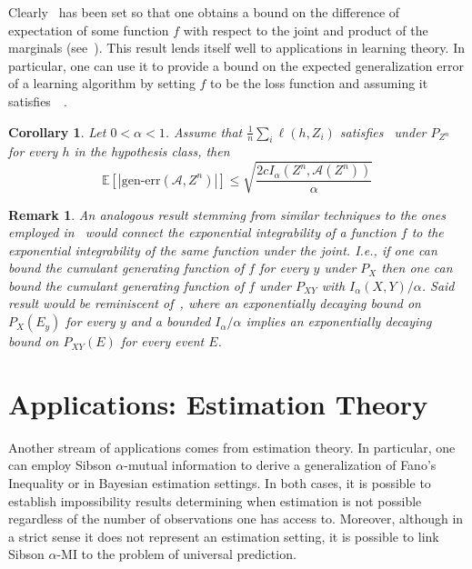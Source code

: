 \documentclass{article}
\numberwithin{theorem}{section}
\newtheorem{corollary}[theorem]{Corollary}
\numberwithin{example}{section}
\newtheorem{remark}{Remark}
\numberwithin{remark}{section}
\numberwithin{definition}{section}
\begin{document}
Clearly~ has been set so that one obtains a bound on the difference of expectation of some function $f$ with respect to the joint and product of the marginals (see~). This result lends itself well to applications in learning theory. In particular, one can use it to provide a bound on the expected generalization error of a learning algorithm by setting $f$ to be the loss function and assuming it satisfies~~\cite{XuR:17,EspositoG:22}.
\begin{corollary}\label{thm:expGenErrSibson}
    Let $0<\alpha<1$.
    Assume that $\frac1n\sum_i \ell (h,Z_i)$ satisfies~ under $P_{Z^n}$ for every $h$ in the hypothesis class, then \begin{equation}
        \mathbb{E}\left[\left|\text{gen-err}(\mathcal{A},Z^n)\right|\right]\leq \sqrt{\frac{2c I_\alpha(Z^n,\mathcal{A}(Z^n))}{\alpha}}
    \end{equation}
\end{corollary}
\begin{remark}

 An analogous result stemming from similar techniques to the ones employed in~ would connect the exponential integrability of a function $f$ to the exponential integrability of the same function under the joint. \textit{I.e.}, if one can bound the cumulant generating function of $f$ for every $y$ under $P_X$ then one can bound the cumulant generating function of $f$ under $P_{XY}$ with $I_\alpha(X,Y)/\alpha$. Said result would be reminiscent of~, where an exponentially decaying bound on $P_X(E_y)$ for every $y$ and a bounded $I_\alpha/\alpha$ implies an exponentially decaying bound on $P_{XY}(E)$ for every event $E$.    
\end{remark}
\section{ Applications: Estimation Theory}\label{sec:estimationTheory}
Another stream of applications comes from estimation theory. In particular, one can employ Sibson $\alpha$-mutual information to derive a generalization of Fano's Inequality or in Bayesian estimation settings. In both cases, it is possible to establish impossibility results determining when estimation is not possible regardless of the number of observations one has access to. Moreover, although in a strict sense it does not represent an estimation setting, it is possible to link Sibson $\alpha$-MI to the problem of universal prediction. 
\end{document}
